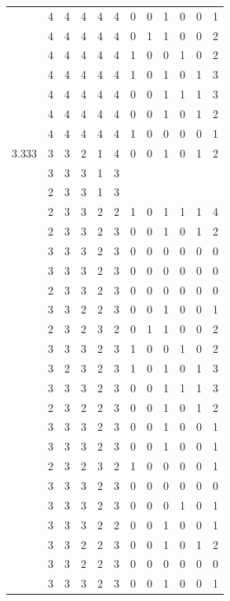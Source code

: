 \documentclass[]{book}
\theoremstyle{definition}
\theoremstyle{definition}
\theoremstyle{definition}
\theoremstyle{remark}
\begin{document}
\begin{table}
{\begin{tabular}[t]{rrrrrrrrrrrr}
 & 4 & 4 & 4 & 4 & 4 & 0 & 0 & 1 & 0 & 0 & 1\\
 & 4 & 4 & 4 & 4 & 4 & 0 & 1 & 1 & 0 & 0 & 2\\
 & 4 & 4 & 4 & 4 & 4 & 1 & 0 & 0 & 1 & 0 & 2\\
 & 4 & 4 & 4 & 4 & 4 & 1 & 0 & 1 & 0 & 1 & 3\\
 & 4 & 4 & 4 & 4 & 4 & 0 & 0 & 1 & 1 & 1 & 3\\
 & 4 & 4 & 4 & 4 & 4 & 0 & 0 & 1 & 0 & 1 & 2\\
 & 4 & 4 & 4 & 4 & 4 & 1 & 0 & 0 & 0 & 0 & 1\\
3.333 & 3 & 3 & 2 & 1 & 4 & 0 & 0 & 1 & 0 & 1 & 2\\
 & 3 & 3 & 3 & 1 & 3 &  &  &  &  &  & \\
 & 2 & 3 & 3 & 1 & 3 &  &  &  &  &  & \\
 & 2 & 3 & 3 & 2 & 2 & 1 & 0 & 1 & 1 & 1 & 4\\
 & 2 & 3 & 3 & 2 & 3 & 0 & 0 & 1 & 0 & 1 & 2\\
 & 3 & 3 & 3 & 2 & 3 & 0 & 0 & 0 & 0 & 0 & 0\\
 & 3 & 3 & 3 & 2 & 3 & 0 & 0 & 0 & 0 & 0 & 0\\
 & 2 & 3 & 3 & 2 & 3 & 0 & 0 & 0 & 0 & 0 & 0\\
 & 3 & 3 & 2 & 2 & 3 & 0 & 0 & 1 & 0 & 0 & 1\\
 & 2 & 3 & 2 & 3 & 2 & 0 & 1 & 1 & 0 & 0 & 2\\
 & 3 & 3 & 3 & 2 & 3 & 1 & 0 & 0 & 1 & 0 & 2\\
 & 3 & 2 & 3 & 2 & 3 & 1 & 0 & 1 & 0 & 1 & 3\\
 & 3 & 3 & 3 & 2 & 3 & 0 & 0 & 1 & 1 & 1 & 3\\
 & 2 & 3 & 2 & 2 & 3 & 0 & 0 & 1 & 0 & 1 & 2\\
 & 3 & 3 & 3 & 2 & 3 & 0 & 0 & 1 & 0 & 0 & 1\\
 & 3 & 3 & 3 & 2 & 3 & 0 & 0 & 1 & 0 & 0 & 1\\
 & 2 & 3 & 2 & 3 & 2 & 1 & 0 & 0 & 0 & 0 & 1\\
 & 3 & 3 & 3 & 2 & 3 & 0 & 0 & 0 & 0 & 0 & 0\\
 & 3 & 3 & 3 & 2 & 3 & 0 & 0 & 0 & 1 & 0 & 1\\
 & 3 & 3 & 3 & 2 & 2 & 0 & 0 & 1 & 0 & 0 & 1\\
 & 3 & 3 & 2 & 2 & 3 & 0 & 0 & 1 & 0 & 1 & 2\\
 & 3 & 3 & 2 & 2 & 3 & 0 & 0 & 0 & 0 & 0 & 0\\
 & 3 & 3 & 3 & 2 & 3 & 0 & 0 & 1 & 0 & 0 & 1\\

\end{tabular}}
\end{table}
\end{document}
